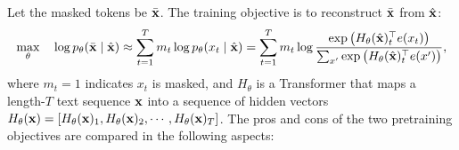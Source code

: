 Let the masked tokens be $\bar{{\mathbf{x}}}$. The training objective is to reconstruct $\bar{{\mathbf{x}}}$ from $\hat{{\mathbf{x}}}$:
\begin{equation}
\label{eqn:ae}
\max_{\theta}\quad \log p_\theta(\bar{{\mathbf{x}}} \mid \hat{{\mathbf{x}}}) 
\approx \sum_{t=1}^{T} m_t \log p_\theta(x_t \mid \hat{{\mathbf{x}}}) 
= \sum_{t=1}^{T} m_t \log \frac{ \exp \left( { H_\theta(\hat{{\mathbf{x}}})_t^\top e(x_t) } \right) }{\sum_{x'} \exp \left( { H_\theta(\hat{{\mathbf{x}}})_t^\top e(x') } \right) },
\end{equation}
where $m_t = 1$ indicates $x_t$ is masked, and $H_\theta$ is a Transformer that maps a length-$T$ text sequence ${\mathbf{x}}$ into a sequence of hidden vectors $H_\theta({\mathbf{x}}) = \left[ {H_\theta({\mathbf{x}})_1, H_\theta({\mathbf{x}})_2, \cdots, H_\theta({\mathbf{x}})_T} \right]$.
The pros and cons of the two pretraining objectives are compared in the following aspects:
